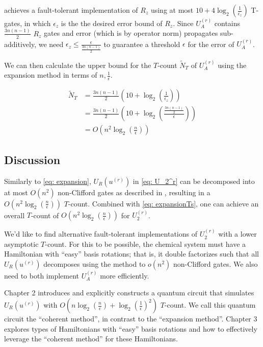 \cite{Rz} achieves a fault-tolerant implementation of $R_z$ using at most $10 + 4\log_2(\frac{1}{\epsilon_z})$ T-gates, in which $\epsilon_z$ is the the desired error bound of $R_z$. Since $U_A^{(r)}$ contains $\frac{3n(n - 1)}{2}$ $R_z$ gates and error (which is by operator norm) propagates sub-additively, we need $\epsilon_z \leq \frac{\epsilon}{\frac{3n(n - 1)}{2}}$ to guarantee a threshold $\epsilon$ for the error of $U_A^{(r)}$.

We can then calculate the upper bound for the $T$-count $\tilde{N}_T$ of $U_A^{(r)}$ using the expansion method in terms of $n, \frac{1}{\epsilon}$.

\begin{equation}
    \begin{split}
        \tilde{N}_T &= \frac{3n(n - 1)}{2}(10 + \log_2(\frac{1}{\epsilon_z})) \\
        &= \frac{3n(n - 1)}{2}(10 + \log_2(\frac{\frac{3n(n - 1)}{2}}{\epsilon})) \\
        &= O(n^2\log_2(\frac{n}{\epsilon}))
    \end{split}
    \label{eq: expansionTs}
\end{equation}

\subsection{Discussion}

Similarly to \eqref{eq: expansion}, $U_R(u^{(r)})$ in \eqref{eq: U_2^r} can be decomposed into at most $O(n^2)$ non-Clifford gates as described in \cite{FSN}, resulting in a $O(n^2\log_2(\frac{n}{\epsilon}))$ $T$-count. Combined with \eqref{eq: expansionTs}, one can achieve an overall $T$-count of $O(n^2\log_2(\frac{n}{\epsilon}))$ for $U_2^{(r)}$.

We'd like to find alternative fault-tolerant implementations of $U_2^{(r)}$ with a lower asymptotic $T$-count. For this to be possible, the chemical system must have a Hamiltonian with ``easy'' basis rotations; that is, it double factorizes such that all $U_R(u^{(r)})$ decomposes using the \cite{FSN} method to $o(n^2)$ non-Clifford gates. We also need to both implement $U_A^{(r)}$ more efficiently.

Chapter 2 introduces and explicitly constructs a quantum circuit that simulates $U_R(u^{(r)})$ with $O(n\log_2(\frac{n}{\epsilon}) + \log_2(\frac{1}{\epsilon})^2)$ $T$-count. We call this quantum circuit the ``coherent method'', in contrast to the ``expansion method''. Chapter 3 explores types of Hamiltonians with ``easy'' basis rotations and how to effectively leverage the ``coherent method'' for these Hamiltonians.


